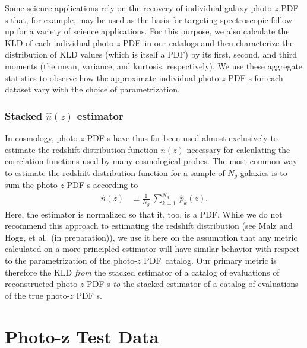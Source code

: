 \documentclass[\docopts]{\docclass}
\newcommand{\pz}{photo-$z$ PDF\xspace}
\begin{document}
Some science applications rely on the recovery of individual galaxy \pz s that, 
for example, may be used as the basis for targeting spectroscopic follow up for 
a variety of science applications.
For this purpose, we also calculate the KLD of each individual \pz\ in our 
catalogs and then characterize the distribution of KLD values (which is itself 
a PDF) by its first, second, and third moments (the mean, variance, and 
kurtosis, respectively).
We use these aggregate statistics to observe how the approximate individual \pz 
s for each dataset vary with the choice of parametrization.

\subsubsection{Stacked $\hat{n}(z)$ estimator}
\label{sec:stacked_metric}

In cosmology, \pz s have thus far been used almost exclusively to estimate the 
redshift distribution function $n(z)$ necessary for calculating the correlation 
functions used by many cosmological probes.
The most common way to estimate the redshift distribution function for a sample 
of $N_{g}$ galaxies is to sum the \pz s according to
\begin{align}
  \label{eq:nz}
  \hat{n}(z) &\equiv \frac{1}{N_{g}}\ \sum_{k=1}^{N_{g}}\ \hat{p}_{k}(z).
\end{align}
Here, the estimator is normalized so that it, too, is a PDF.
While we do not recommend this approach to estimating the redshift distribution 
(see Malz and Hogg, et al.\ (in preparation)), we use it here on the assumption 
that any metric calculated on a more principled estimator will have similar 
behavior with respect to the parametrization of the \pz\ catalog.
Our primary metric is therefore the KLD \textit{from} the stacked estimator of 
a catalog of evaluations of reconstructed \pz s \textit{to} the stacked 
estimator of a catalog of evaluations of the true \pz s.


\section{Photo-z Test Data}
\label{sec:data}
\end{document}
